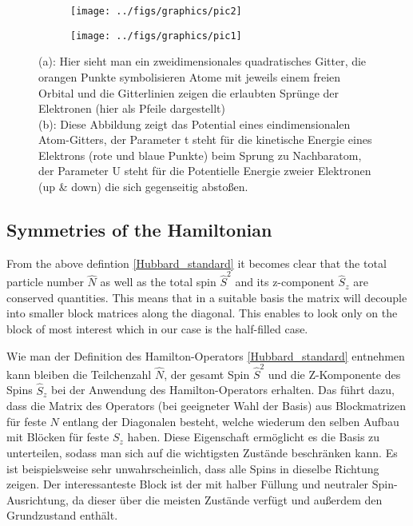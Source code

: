 \begin{figure}[h!]
	\begin{subfigure}{.5 \textwidth}
		\centering
		\texttt{[image: ../figs/graphics/pic2]}
		\caption{\cite{FigHubbardModel2}}
		\label{fig:pic2}
	\end{subfigure}
	\begin{subfigure}{.5 \textwidth}
		\centering
		\texttt{[image: ../figs/graphics/pic1]}
		\caption{\cite{FigHubbardModel1}}
		\label{fig:pic1}
	\end{subfigure}
\caption[Veranschaulichung des Hubbard-Modells]{(a): Hier sieht man ein zweidimensionales quadratisches Gitter, die orangen Punkte symbolisieren Atome mit jeweils einem freien Orbital und die Gitterlinien zeigen die erlaubten Sprünge der Elektronen (hier als Pfeile dargestellt)\\(b): Diese Abbildung zeigt das Potential eines eindimensionalen Atom-Gitters, der Parameter t steht für die kinetische Energie eines Elektrons (rote und blaue Punkte) beim Sprung zu Nachbaratom, der Parameter U steht für die Potentielle Energie zweier Elektronen (up \& down) die sich gegenseitig abstoßen.}
\label{HubbardFigs}
\end{figure}



\subsection{Symmetries of the Hamiltonian}
From the above defintion \eqref{Hubbard_standard} it becomes clear that the total particle number $ \hat{N} $ as well as the total spin $ \hat{S}^2 $ and its z-component $ \hat{S}_z $ are conserved quantities. This means that in a suitable basis the matrix will decouple into smaller block matrices along the diagonal. This enables to look only on the block of most interest which in our case is the half-filled case. 

Wie man der Definition des Hamilton-Operators \eqref{Hubbard_standard} entnehmen kann bleiben die Teilchenzahl $ \hat{N} $, der gesamt Spin $ \hat{S}^2 $ und die Z-Komponente des Spins $ \hat{S}_z $ bei der Anwendung des Hamilton-Operators erhalten. Das führt dazu, dass die Matrix des Operators (bei geeigneter Wahl der Basis) aus Blockmatrizen für feste $ N $ entlang der Diagonalen besteht, welche wiederum den selben Aufbau mit Blöcken für feste $ S_z $ haben. Diese Eigenschaft ermöglicht es die Basis zu unterteilen, sodass man sich auf die wichtigsten Zustände beschränken kann. Es ist beispielsweise sehr unwahrscheinlich, dass alle Spins in dieselbe Richtung zeigen. Der interessanteste Block ist der mit halber Füllung und neutraler Spin-Ausrichtung, da dieser über die meisten Zustände verfügt und außerdem den Grundzustand enthält.


